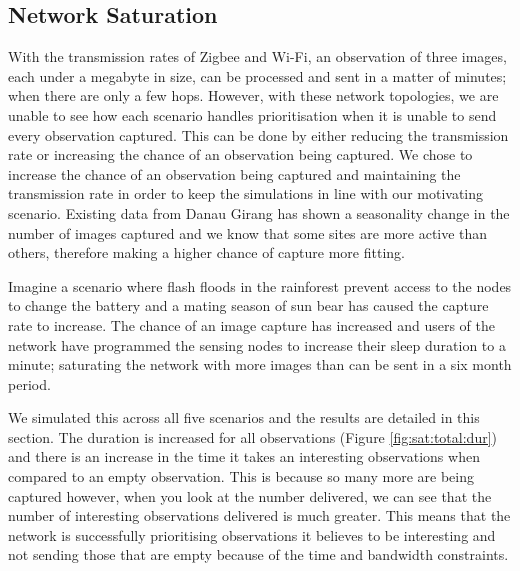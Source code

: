 \subsection{Network Saturation}

With the transmission rates of Zigbee and Wi-Fi, an observation of three images, each under a megabyte in size, can be processed and sent in a matter of minutes; when there are only a few hops. However, with these network topologies, we are unable to see how each scenario handles prioritisation when it is unable to send every observation captured. This can be done by either reducing the transmission rate or increasing the chance of an observation being captured. We chose to increase the chance of an observation being captured and maintaining the transmission rate in order to keep the simulations in line with our motivating scenario. Existing data from Danau Girang has shown a seasonality change in the number of images captured and we know that some sites are more active than others, therefore making a higher chance of capture more fitting. 

Imagine a scenario where flash floods in the rainforest prevent access to the nodes to change the battery and a mating season of sun bear has caused the capture rate to increase. The chance of an image capture has increased and users of the network have programmed the sensing nodes to increase their sleep duration to a minute; saturating the network with more images than can be sent in a six month period.

We simulated this across all five scenarios and the results are detailed in this section. The duration is increased for all observations (Figure \ref{fig:sat:total:dur}) and there is an increase in the time it takes an interesting observations when compared to an empty observation. This is because so many more are being captured however, when you look at the number delivered, we can see that the number of interesting observations delivered is much greater. This means that the network is successfully prioritising observations it believes to be interesting and not sending those that are empty because of the time and bandwidth constraints.

